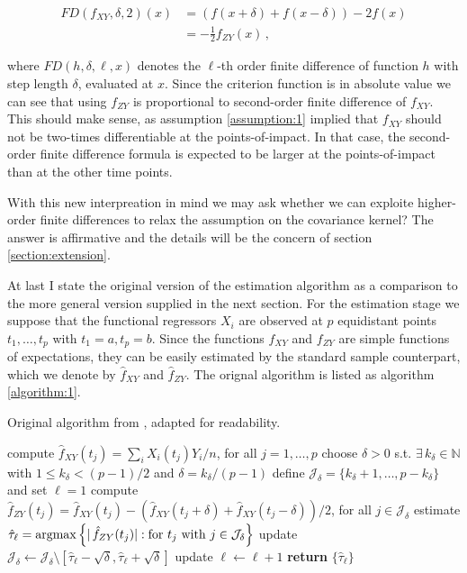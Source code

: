 \begin{align*}
    FD(f_{XY}, \delta, 2)(x) &= \left( f(x + \delta) + f(x - \delta) \right) - 2 f(x)\\
                             &= - \frac{1}{2} f_{ZY}(x) \,,
\end{align*}

where $FD(h, \delta, \ell, x)$ denotes the $\ell$-th order finite difference of function
$h$ with step length $\delta$, evaluated at $x$. Since the criterion function is in
absolute value we can see that using $f_{ZY}$ is proportional to second-order finite
difference of $f_{XY}$. This should make sense, as assumption \ref{assumption:1} implied
that $f_{XY}$ should not be two-times differentiable at the points-of-impact. In that
case, the second-order finite difference formula is expected to be larger at the
points-of-impact than at the other time points.


With this new interpreation in mind we may ask whether we can exploite higher-order
finite differences to relax the assumption on the covariance kernel? The answer is
affirmative and the details will be the concern of section \ref{section:extension}.


At last I state the original version of the estimation algorithm as a comparison to the
more general version supplied in the next section. For the estimation stage we suppose
that the functional regressors $X_i$ are observed at $p$ equidistant points $t_1, \dots,
t_p$ with $t_1 = a, t_p = b$. Since the functions $f_{XY}$ and $f_{ZY}$ are simple
functions of expectations, they can be easily estimated by the standard sample
counterpart, which we denote by $\hat{f}_{XY}$ and $\hat{f}_{ZY}$. The orignal algorithm
is listed as algorithm \ref{algorithm:1}.

\begin{tcolorbox}[standard jigsaw, opacityback=0]

\begin{algorithm}[H]
\caption{Original algorithm from \cite{Kneip2020}, adapted for readability.}
\label{algorithm:1}
\begin{algorithmic}[1]
  \State compute $\hat{f}_{XY}(t_j) = \sum_i X_i(t_j) Y_i / n$, for all $j=1,\dots,p$
  \State choose $\delta > 0$ s.t. $\exists \, k_{\delta} \in \mathbb{N}$ with $1 \leq
  k_{\delta} < (p - 1)/2$ and $\delta = k_{\delta} / (p-1)$
  \State define $\mathcal{J}_{\delta} = \{k_{\delta} + 1, \dots, p - k_{\delta}\}$ and
  set $\ell = 1$
  \State compute $\hat{f}_{ZY}(t_j) = \hat{f}_{XY}(t_j) - (\hat{f}_{XY}(t_j + \delta) +
  \hat{f}_{XY}(t_j - \delta)) / 2$, for all $j \in \mathcal{J}_{\delta}$
  \State estimate $\hat{\tau}_{\ell} = \operatorname*{argmax} \left\{|\,\hat{f}_{ZY}(t_j)| : \text{for }
      t_j \text{ with } j \in \mathcal{J}_{\delta}\right\}$
    \State update $\mathcal{J}_{\delta} \leftarrow \mathcal{J}_{\delta} \setminus
    [\hat{\tau}_{\ell} - \sqrt{\delta}, \hat{\tau}_{\ell} + \sqrt{\delta}]$
    \State update $\ell \leftarrow \ell + 1$
  \EndWhile
  \State \textbf{return} $\{\hat{\tau}_{\ell}\}$
\end{algorithmic}
\end{algorithm}

\end{tcolorbox}
